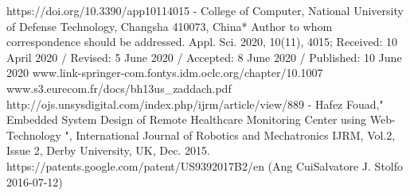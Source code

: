\documentclass[]{report}
\begin{document}
https://doi.org/10.3390/app10114015 - 
College of Computer, National University of Defense Technology, Changsha 410073, China* 
Author to whom correspondence should be addressed. 
Appl. Sci. 2020, 10(11), 4015;  
Received: 10 April 2020 / Revised: 5 June 2020 / Accepted: 8 June 2020 / Published: 10 June 2020 
\newline
\newline
www.link-springer-com.fontys.idm.oclc.org/chapter/10.1007%
\newline
\newline
www.s3.eurecom.fr/docs/bh13us\_zaddach.pdf
\newline
\newline
http://ojs.unsysdigital.com/index.php/ijrm/article/view/889 - Hafez Fouad," Embedded System Design of Remote Healthcare Monitoring Center using Web-Technology ", International Journal of Robotics and Mechatronics IJRM, Vol.2, Issue 2, Derby University, UK, Dec. 2015.
\newline
https://patents.google.com/patent/US9392017B2/en (Ang CuiSalvatore J. Stolfo 2016-07-12)
\end{document}

